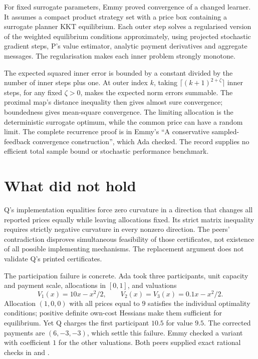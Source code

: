 \documentclass{article}
\begin{document}
For fixed surrogate parameters, Emmy proved convergence of a changed learner.
It assumes a compact product strategy set with a price box containing a surrogate planner KKT equilibrium.
Each outer step solves a regularised version of the weighted equilibrium conditions approximately, using
projected stochastic gradient steps, P's value estimator, analytic payment derivatives and aggregate messages.
The regularisation makes each inner problem strongly monotone.

The expected squared inner error is bounded by a constant divided by the number of inner steps plus one.
At outer index \(k\), taking \(\lceil(k+1)^{2+\zeta}\rceil\) inner steps, for any fixed \(\zeta>0\), makes the
expected norm errors summable.
The proximal map's distance inequality then gives almost sure convergence; boundedness gives mean-square convergence.
The limiting allocation is the deterministic surrogate optimum, while the common price can have a random limit.
The complete recurrence proof is in Emmy's ``A conservative sampled-feedback convergence construction'', which Ada checked.
The record supplies no efficient total sample bound or stochastic performance benchmark.

\section{What did not hold}
Q's implementation equalities force zero curvature in a direction that changes all reported prices equally while leaving allocations fixed.
Its strict matrix inequality requires strictly negative curvature in every nonzero direction.
The peers' contradiction disproves simultaneous feasibility of those certificates, not existence of all possible implementing mechanisms.
The replacement argument does not validate Q's printed certificates.

The participation failure is concrete.
Ada took three participants, unit capacity and payment scale, allocations in \([0,1]\), and valuations
\[
 V_1(x)=10x-x^2/2,\qquad V_2(x)=V_3(x)=0.1x-x^2/2.
\]
Allocation \((1,0,0)\) with all prices equal to \(9\) satisfies the individual optimality conditions; positive
definite own-cost Hessians make them sufficient for equilibrium.
Yet Q charges the first participant \(10.5\) for value \(9.5\).
The corrected payments are \((6,-3,-3)\), which settle this failure.
Emmy checked a variant with coefficient \(1\) for the other valuations.
Both peers supplied exact rational checks in  and .
\end{document}
